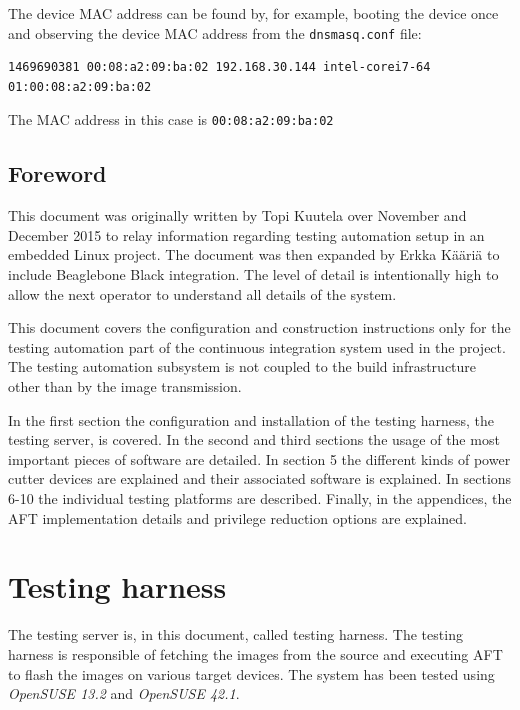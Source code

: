 \documentclass[a4paper,11pt]{article}
\newcommand{\cmd}[1]{\texttt{#1}}
\begin{document}
\begin{enumerate}
The device MAC address can be found by, for example, booting the device once and observing the device MAC address from the \cmd{dnsmasq.conf} file:

\begin{lstlisting}
1469690381 00:08:a2:09:ba:02 192.168.30.144 intel-corei7-64 01:00:08:a2:09:ba:02
\end{lstlisting}

The MAC address in this case is \cmd{00:08:a2:09:ba:02}

\end{enumerate}

\pagebreak

\subsection{Foreword}
This document was originally written by Topi Kuutela over November and December 2015 to relay information regarding testing automation setup in an embedded Linux project. The document was then expanded by Erkka Kääriä to include Beaglebone Black integration. The level of detail is intentionally high to allow the next operator to understand all details of the system. 

This document covers the configuration and construction instructions only for the testing automation part of the continuous integration system used in the project. The testing automation subsystem is not coupled to the build infrastructure other than by the image transmission.

In the first section the configuration and installation of the testing harness, the testing server, is covered. In the second and third sections the usage of the most important pieces of software are detailed. In section 5 the different kinds of power cutter devices are explained and their associated software is explained. In sections 6-10 the individual testing platforms are described. Finally, in the appendices, the AFT implementation details and privilege reduction options are explained.

\pagebreak

\section{Testing harness}
\label{testingharness}
The testing server is, in this document, called testing harness. The testing harness is responsible of fetching the images from the source and executing AFT to flash the images on various target devices. The system has been tested using \emph{OpenSUSE 13.2} and \emph{OpenSUSE 42.1}.
\end{document}

